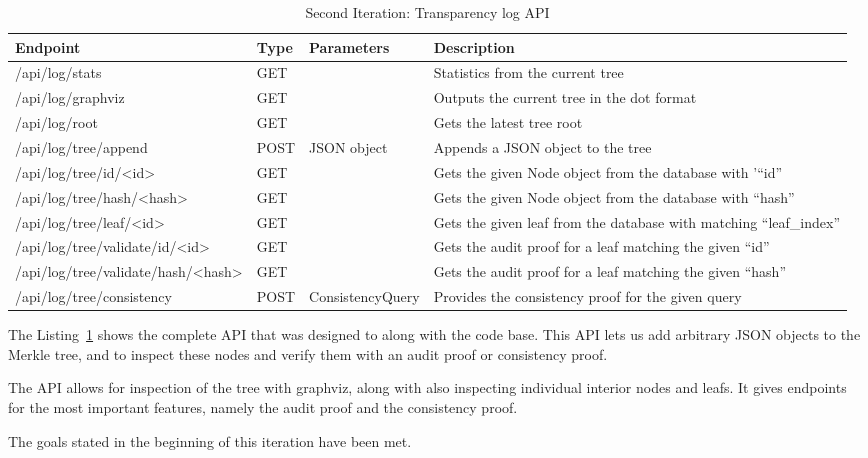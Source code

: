 \documentclass[../Main/thesis.tex]{subfiles}
\begin{document}
\begin{table}[H]
\footnotesize
\centering
\settowidth{}
\setlength\extrarowheight{2pt}
\begin{tabulary}{1.0\textwidth}{|l|L|l|L|}
\hline
    \textbf{Endpoint} & 
    \textbf{Type} & 
    \textbf{Parameters} & 
    \textbf{Description} \\
\hline
    /api/log/stats & GET & & Statistics from the current tree \\ \hline
    /api/log/graphviz & GET & & Outputs the current tree in the dot format \\ \hline
    /api/log/root & GET & & Gets the latest tree root \\ \hline
    /api/log/tree/append & POST & JSON object & Appends a JSON object to the tree \\ \hline
    /api/log/tree/id/<id> & GET & & Gets the given Node object from the database with '``id''\\ \hline
    /api/log/tree/hash/<hash> & GET & & Gets the given Node object from the database with ``hash''\\ \hline
    /api/log/tree/leaf/<id> & GET & & Gets the given leaf from the database with matching ``leaf\_index''\\ \hline
    /api/log/tree/validate/id/<id> & GET & & Gets the audit proof for a leaf matching the given ``id''\\ \hline
    /api/log/tree/validate/hash/<hash> & GET & & Gets the audit proof for a leaf matching the given ``hash''\\ \hline
    /api/log/tree/consistency & POST & ConsistencyQuery & Provides the consistency proof for the given query\\ \hline
\end{tabulary}
\caption{Second Iteration: Transparency log API}
\label{api:transparency_log}
\end{table}

The Listing~\ref{api:transparency_log} shows the complete API that was designed
to along with the code base. This API lets us add arbitrary JSON objects to the
Merkle tree, and to inspect these nodes and verify them with an audit proof or
consistency proof.

The API allows for inspection of the tree with graphviz, along with also
inspecting individual interior nodes and leafs. It gives endpoints for the most
important features, namely the audit proof and the consistency proof.

The goals stated in the beginning of this iteration have been met. 
\end{document}
